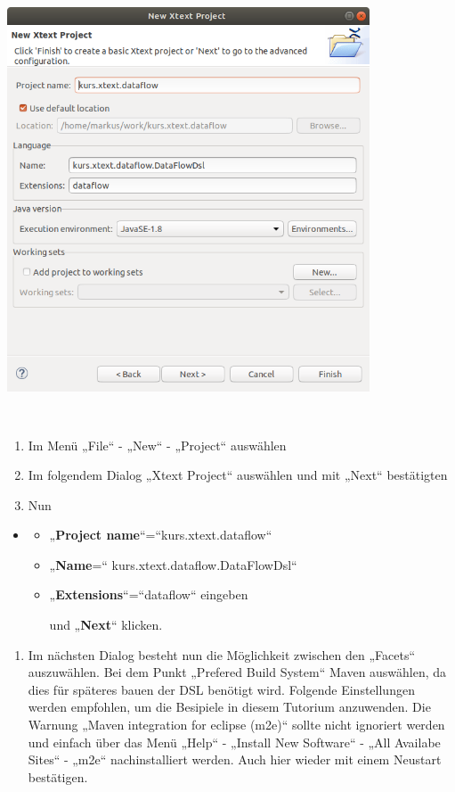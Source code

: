 \documentclass[a4]{article}
\providecommand{\tightlist}{%
  \setlength{\itemsep}{0pt}\setlength{\parskip}{0pt}}
\begin{document}
\includegraphics[width=4.24090in,height=5.15550in]{./Pictures/10000201000002650000028845D817BB3C722F32.png}

\begin{enumerate}
\def\labelenumi{\arabic{enumi}.}
\tightlist
\item
  Im Menü „File`` - „New`` - „Project`` auswählen
\item
  Im folgendem Dialog „Xtext Project`` auswählen und mit „Next``
  bestätigten
\item
  Nun 
\end{enumerate}

\begin{itemize}
\item
  \begin{itemize}
  \item
    „\textbf{Project name}``=``kurs.xtext.dataflow``
  \item
    „\textbf{Name}=`` kurs.xtext.dataflow.DataFlowDsl``
  \item
    „\textbf{Extensions}``=``dataflow`` eingeben

    und „\textbf{Next}`` klicken.
  \end{itemize}
\end{itemize}

\begin{enumerate}
\def\labelenumi{\arabic{enumi}.}
\tightlist
\item
  Im nächsten Dialog besteht nun die Möglichkeit zwischen den „Facets``
  auszuwählen. Bei dem Punkt „Prefered Build System`` Maven auswählen,
  da dies für späteres bauen der DSL benötigt wird. Folgende
  Einstellungen werden empfohlen, um die Besipiele in diesem Tutorium
  anzuwenden. Die Warnung „Maven integration for eclipse (m2e)`` sollte
  nicht ignoriert werden und einfach über das Menü „Help`` - „Install
  New Software`` - „All Availabe Sites`` - „m2e`` nachinstalliert
  werden. Auch hier wieder mit einem Neustart bestätigen.
\end{enumerate}
\end{document}

